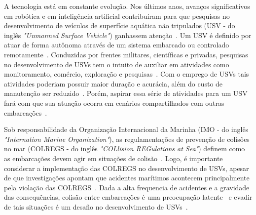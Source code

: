     
    A tecnologia está em constante evolução. Nos últimos anos, avanços significativos em robótica e em inteligência artificial contribuíram para que pesquisas no desenvolvimento de veículos de superfície aquática não tripulados (USV - do inglês \textit{"Unmanned Surface Vehicle"}) ganhassem atenção~\cite{HUANG2020451}. Um USV é definido por atuar de forma autônoma através de um sistema embarcado ou controlado remotamente~\cite{SONG2018351}. Conduzidas por frentes militares, científicas e privadas, pesquisas no desenvolvimento de USVs tem o intuito de auxiliar em atividades como monitoramento, comércio, exploração e pesquisas~\cite{JURAK2020}. Com o emprego de USVs tais atividades poderiam possuir maior duração e acurácia, além do custo de manutenção ser reduzido~\cite{LIU201671}. Porém, aspirar essa série de atividades para um USV fará com que sua atuação ocorra em cenários compartilhados com outras embarcações~\cite{KUWATA2014110}.

    Sob responsabilidade da Organização Internacional da Marinha (IMO - do inglês \textit{"Internation Marine Organization"}), as regulamentações de prevenção de colisões no mar (COLREGS - do inglês \textit{"COLlision REGulations at Sea"}) definem como as embarcações devem agir em situações de colisão~\cite{JURAK2020}. Logo, é importante considerar a implementação das COLREGS no desenvolvimento de USVs, apesar de que investigações apontam que acidentes marítimos acontecem principalmente pela violação das COLREGS~\cite{SONG2018351}. Dada a alta frequencia de acidentes e a gravidade das consequências, colisão entre embarcações é uma preocupação latente~\cite{HUANG2019142} e evadir de tais situações é um desafio no desenvolvimento de USVs~\cite{JURAK2020}.

